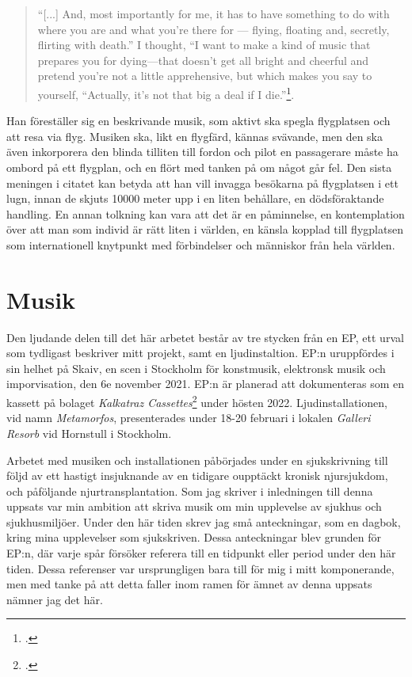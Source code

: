 \documentclass{article}
\begin{document}
\begin{quote}
``[...] And, most importantly for me, it has to have
something to do with where you are and what you're there for --- flying, floating and, secretly, flirting with
death.'' I thought, ``I want to make a kind of music that prepares you for dying—that doesn’t get all bright and
cheerful and pretend you’re not a little apprehensive, but which makes you say to yourself, ``Actually, it’s
not that big a deal if I die.''\footcite[152]{Eno}.
\end{quote}

Han föreställer sig en beskrivande musik, som aktivt ska spegla flygplatsen och att resa via flyg. Musiken
ska, likt en flygfärd, kännas svävande, men den ska även inkorporera den blinda tilliten till fordon och pilot
en passagerare måste ha ombord på ett flygplan, och en flört med tanken på om något går fel. Den sista meningen i
citatet kan betyda att han vill invagga besökarna på flygplatsen i ett lugn, innan de skjuts 10000 meter upp 
i en liten behållare, en dödsföraktande handling. En annan tolkning kan vara att det är en påminnelse, en
kontemplation över att man som individ är rätt liten i världen, en känsla kopplad till flygplatsen som 
internationell knytpunkt med förbindelser och människor från hela världen. 

\pagebreak
\section{Musik}
Den ljudande delen till det här arbetet består av tre stycken från en EP, ett urval som tydligast beskriver
mitt projekt, samt en ljudinstaltion. EP:n uruppfördes i sin helhet på Skaiv, en scen i Stockholm för
konstmusik, elektronsk musik och imporvisation, den 6e november 2021. EP:n är planerad att dokumenteras som en
kassett på bolaget \emph{Kalkatraz Cassettes}\footcite{kalkatraz} under hösten 2022.
Ljudinstallationen, vid namn \emph{Metamorfos}, presenterades under 18-20 februari i lokalen \emph{Galleri
Resorb} vid Hornstull i Stockholm. 

Arbetet med musiken och installationen påbörjades under en sjukskrivning till följd av ett hastigt
insjuknande av en tidigare oupptäckt kronisk njursjukdom, och påföljande njurtransplantation. Som jag skriver
i inledningen till denna uppsats var min ambition att skriva musik om min upplevelse av sjukhus och
sjukhusmiljöer. Under den här tiden skrev jag små anteckningar, som en dagbok, kring mina upplevelser som
sjukskriven. Dessa anteckningar blev grunden för EP:n, där varje spår försöker referera till en tidpunkt eller
period under den här tiden. Dessa referenser var ursprungligen bara till för mig i mitt komponerande, men med
tanke på att detta faller inom ramen för ämnet av denna uppsats nämner jag det här. 
\end{document}
